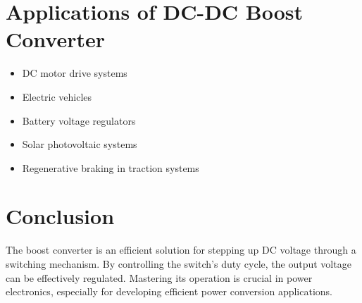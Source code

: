 \documentclass[12pt]{article}
\begin{document}
\section*{Applications of DC-DC Boost Converter}
\begin{itemize}
    \item DC motor drive systems
    \item Electric vehicles
    \item Battery voltage regulators
    \item Solar photovoltaic systems
    \item Regenerative braking in traction systems
\end{itemize}

\section*{Conclusion}
The boost converter is an efficient solution for stepping up DC voltage through a switching mechanism. By controlling the switch's duty cycle, the output voltage can be effectively regulated. Mastering its operation is crucial in power electronics, especially for developing efficient power conversion applications.


\renewcommand{\bibname}{References}

\end{document}
